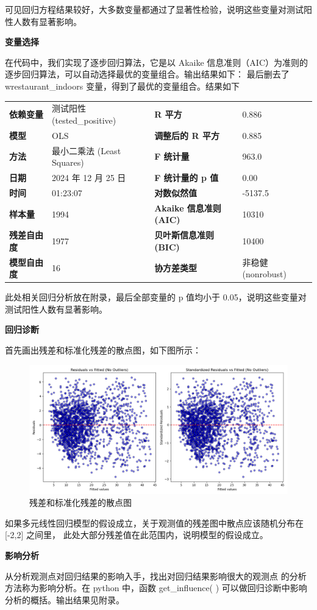 \documentclass[UTF8,ctexart,a4paper,11pt,openany]{article}
\theoremstyle{definition}
\begin{document}
    可见回归方程结果较好，大多数变量都通过了显著性检验，说明这些变量对测试阳性人数有显著影响。
    \par \noindent \textbf{变量选择}\par
    在代码中，我们实现了逐步回归算法，它是以 Akaike 信息准则（AIC）为准则的逐步回归算法，可以自动选择最优的变量组合。输出结果如下：                                           
最后删去了 wrestaurant\_indoors 变量，得到了最优的变量组合。结果如下\par 
\begin{tabular}{|l l l l|}
    \hline
    \textbf{依赖变量} & 测试阳性 (tested\_positive) & \textbf{R 平方} & 0.886 \\
    \textbf{模型} & OLS & \textbf{调整后的 R 平方} & 0.885 \\
    \textbf{方法} & 最小二乘法 (Least Squares) & \textbf{F 统计量} & 963.0 \\
    \textbf{日期} & 2024 年 12 月 25 日 & \textbf{F 统计量的 p 值} & 0.00 \\
    \textbf{时间} & 01:23:07 & \textbf{对数似然值} & -5137.5 \\
    \textbf{样本量} & 1994 & \textbf{Akaike 信息准则 (AIC)} & 10310 \\
    \textbf{残差自由度} & 1977 & \textbf{贝叶斯信息准则 (BIC)} & 10400 \\
    \textbf{模型自由度} & 16 & \textbf{协方差类型} & 非稳健 (nonrobust) \\
    \hline
\end{tabular}
此处相关回归分析放在附录，最后全部变量的 p 值均小于 0.05，说明这些变量对测试阳性人数有显著影响。
\par \noindent \textbf{回归诊断}\par
    首先画出残差和标准化残差的散点图，如下图所示：
    \begin{figure}[H]
        \centering
        \includegraphics[width=1\textwidth]{Figure_8.png}
        \caption{残差和标准化残差的散点图}
        \label{fig:residuals}
    \end{figure}
    如果多元线性回归模型的假设成立，关于观测值的残差图中散点应该随机分布在 [-2,2] 之间里，
    此处大部分残差值在此范围内，说明模型的假设成立。
    \par
    \noindent \textbf{影响分析}\par
    从分析观测点对回归结果的影响入手，找出对回归结果影响很大的观测点
的分析方法称为影响分析。在 python 中，函数 get\_influence( ) 可以做回归诊断中影响分析的概括。输出结果见附录。
\newpage
\end{document}

